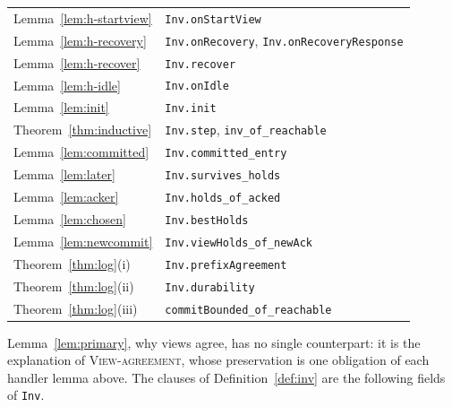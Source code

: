 \documentclass[11pt,a4paper]{article}
\theoremstyle{plain}
\theoremstyle{definition}
\theoremstyle{remark}
\newcommand{\OneLog}{\textsc{View-agreement}}
\begin{document}
\begin{center}
\begin{tabular}{@{}lp{9.2cm}@{}}
Lemma~\ref{lem:h-startview} & \texttt{Inv.onStartView} \\
Lemma~\ref{lem:h-recovery} & \texttt{Inv.onRecovery}, \texttt{Inv.onRecoveryResponse} \\
Lemma~\ref{lem:h-recover} & \texttt{Inv.recover} \\
Lemma~\ref{lem:h-idle} & \texttt{Inv.onIdle} \\
Lemma~\ref{lem:init} & \texttt{Inv.init} \\
Theorem~\ref{thm:inductive} & \texttt{Inv.step}, \texttt{inv\_of\_reachable} \\
Lemma~\ref{lem:committed} & \texttt{Inv.committed\_entry} \\
Lemma~\ref{lem:later} & \texttt{Inv.survives\_holds} \\
Lemma~\ref{lem:acker} & \texttt{Inv.holds\_of\_acked} \\
Lemma~\ref{lem:chosen} & \texttt{Inv.bestHolds} \\
Lemma~\ref{lem:newcommit} & \texttt{Inv.viewHolds\_of\_newAck} \\
Theorem~\ref{thm:log}(i) & \texttt{Inv.prefixAgreement} \\
Theorem~\ref{thm:log}(ii) & \texttt{Inv.durability} \\
Theorem~\ref{thm:log}(iii) & \texttt{commitBounded\_of\_reachable} \\
\bottomrule
\end{tabular}
\end{center}

Lemma~\ref{lem:primary}, why views agree, has no single counterpart: it
is the explanation of \OneLog, whose preservation is one obligation of
each handler lemma above. The clauses of Definition~\ref{def:inv} are
the following fields of \texttt{Inv}.
\end{document}
